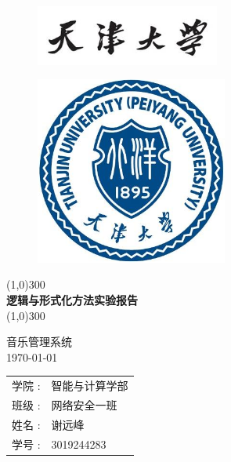 \documentclass[14pt]{article}
\numberwithin{figure}{subsection}
\begin{document}
\begin{titlepage}
    \begin{center}
        \begin{figure}[H]
            \centering
            \includegraphics[width=6.048cm,height=1.98cm]{Content.png}
        \end{figure}
        \begin{figure}[H]
            \centering
            \includegraphics[width=6.318cm,height=6.174cm]{Cover.png}
        \end{figure}
        \vspace*{2cm}
        \line(1,0){300}\\
        [0.05cm]
        \Huge{\bfseries 逻辑与形式化方法实验报告 }\\
        \line(1,0){300}\\
        \LARGE {音乐管理系统\\
        \today\\
        [0.5cm]

        \begin{tabular}{rl}
            学院 :        & 智能与计算学部 \\
            班级 :        & 网络安全一班   \\
            姓名        : & 谢远峰         \\
            学号       :  & 3019244283
        \end{tabular}
        }
    \end{center}

\end{titlepage}
\clearpage
\end{document}
